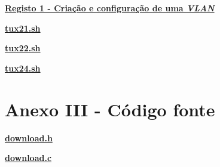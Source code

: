 \documentclass[a4paper, 11pt]{article}
\begin{document}
\begin{changemargin}{-3cm}{-4cm}
{\underline{\textbf{Registo 1 - Criação e configuração de uma \textit{VLAN}}}}
{\small}
\end{changemargin}

\hfill

\begin{changemargin}{-3cm}{-4cm}
{\underline{\textbf{tux21.sh}}}
{\small}
\end{changemargin}

\hfill

\begin{changemargin}{-3cm}{-4cm}
{\underline{\textbf{tux22.sh}}}
{\small}
\end{changemargin}

\hfill

\begin{changemargin}{-3cm}{-4cm}
{\underline{\textbf{tux24.sh}}}
{\small}
\end{changemargin}

\clearpage

\newpage
\section{Anexo III - Código fonte}

\begin{changemargin}{-3cm}{-4cm}
{\underline{\textbf{download.h}}}
{\small}
\end{changemargin}

\hfill

\begin{changemargin}{-3cm}{-4cm}
{\underline{\textbf{download.c}}}
{\small}
\end{changemargin}
\end{document}
